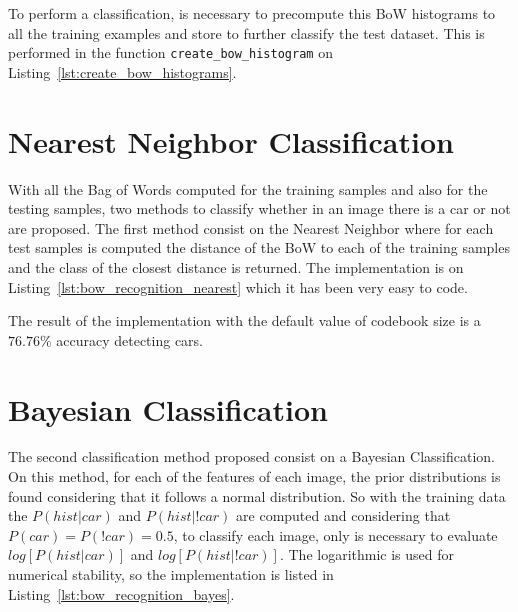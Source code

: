 \documentclass{ethz_report}
\begin{document}


To perform a classification, is necessary to precompute this BoW histograms to all the training examples and store to further classify the test dataset. This is performed in the function \texttt{create\_bow\_histogram} on Listing~\ref{lst:create_bow_histograms}.



\section*{Nearest Neighbor Classification}

With all the Bag of Words computed for the training samples and also for the testing samples, two methods to classify whether in an image there is a car or not are proposed.
The first method consist on the Nearest Neighbor where for each test samples is computed the distance of the BoW to each of the training samples and the class of the closest distance is returned. The implementation is on Listing~\ref{lst:bow_recognition_nearest} which it has been very easy to code.



The result of the implementation with the default value of codebook size is a $76.76\%$ accuracy detecting cars.

\section*{Bayesian Classification}

The second classification method proposed consist on a Bayesian Classification. On this method, for each of the features of each image, the prior distributions is found considering that it follows a normal distribution.
So with the training data the $P(hist|car)$ and $P(hist|!car)$ are computed and considering that $P(car)=P(!car)=0.5$, to classify each image, only is necessary to evaluate $log[P(hist|car)]$ and $log[P(hist|!car)]$. The logarithmic is used for numerical stability, so the implementation is listed in Listing~\ref{lst:bow_recognition_bayes}.


\end{document}
